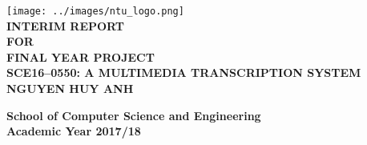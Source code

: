 \begin{titlepage}
\begin{center}

\texttt{[image: ../images/ntu\_logo.png]}
\\[4cm]

\uppercase{
    \textbf{Interim Report}\\
    \textbf{for}\\
    \textbf{Final Year Project}
    \\[2cm]
    \textbf{SCE16--0550: A Multimedia Transcription System}
    \\[2cm]
    \textbf{Nguyen Huy Anh}
}

\vfill

\textbf{School of Computer Science and Engineering}
\\
\textbf{Academic Year 2017/18}

\end{center}
\end{titlepage}
